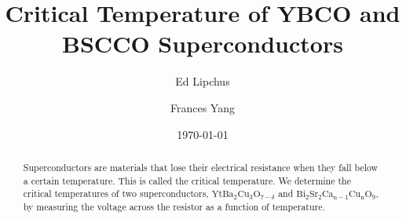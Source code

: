 \documentclass[prb,preprint]{revtex4-1}
\begin{document}

\title{Critical Temperature of YBCO and BSCCO Superconductors}

\author{Ed Lipchus}



\author{Frances Yang}


\date{\today}

\begin{abstract}
Superconductors are materials that lose their electrical resistance  when they fall below a certain temperature. This is called the critical temperature. We determine the critical temperatures of two superconductors,  $\textrm{Yt}\textrm{Ba}_{2}\textrm{Cu}_{3}\textrm{O}_{7-\delta}$ and $\textrm{Bi}_{2}\textrm{Sr}_{2}\textrm{Ca}_{\textrm{n}-1}\textrm{Cu}_{\textrm{n}}\textrm{O}_{9}$, by measuring the voltage across the resistor as a function of temperature. 
\end{abstract}

\maketitle %
\end{document}
